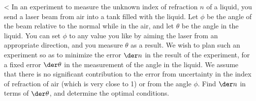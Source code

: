 <%
In an experiment to measure the unknown index of refraction $n$ of a liquid, you send
a laser beam from air into a tank filled with the liquid. 
Let $\phi$ be the angle of the beam relative to the normal while in the
air, and let $\theta$ be the angle in the liquid. You can set $\phi$ to any value you
like by aiming the laser from an appropriate direction, and you measure $\theta$ as
a result. We wish to plan such an experiment so as to minimize
the error $\der n$ in the result of the experiment, for a fixed error $\der \theta$
in the measurement of the angle in the liquid. We assume that there is no significant
contribution to the error from uncertainty in the index of refraction of air (which is
very close to 1) or from the angle $\phi$. Find $\der n$ in terms of $\der\theta$, and
determine the optimal conditions.

